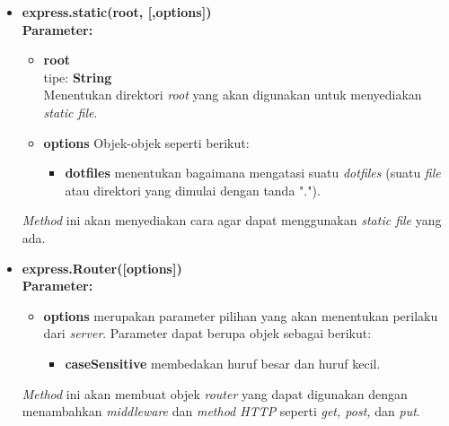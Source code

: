 \begin{itemize}
%			

	\item \textbf{express.static(root, [,options])} \\
	\textbf{Parameter:}
	\begin{itemize}
		\item \textbf{root} \\ tipe: \textbf{String} \\ Menentukan direktori \textit{root} yang akan digunakan untuk menyediakan \textit{static file}.
		\item \textbf{options} Objek-objek seperti berikut:
			\begin{itemize}
				\item \textbf{dotfiles} menentukan bagaimana mengatasi suatu \textit{dotfiles} (suatu \textit{file} atau direktori yang dimulai dengan tanda ".").
			\end{itemize}
	\end{itemize}
	
	\textit{Method} ini akan menyediakan cara agar dapat menggunakan \textit{static file} yang ada.
	
	\item \textbf{express.Router([options])} \\
	\textbf{Parameter:}
	\begin{itemize}
		\item \textbf{options} merupakan parameter pilihan yang akan menentukan perilaku dari \textit{server}. Parameter dapat berupa objek sebagai berikut:
		\begin{itemize}
			\item \textbf{caseSensitive} membedakan huruf besar dan huruf kecil.
		\end{itemize}
	\end{itemize}

	\textit{Method} ini akan membuat objek \textit{router} yang dapat digunakan dengan menambahkan \textit{middleware} dan \textit{method HTTP} seperti \textit{get, post,} dan \textit{put}.
	 
	
\end{itemize}

